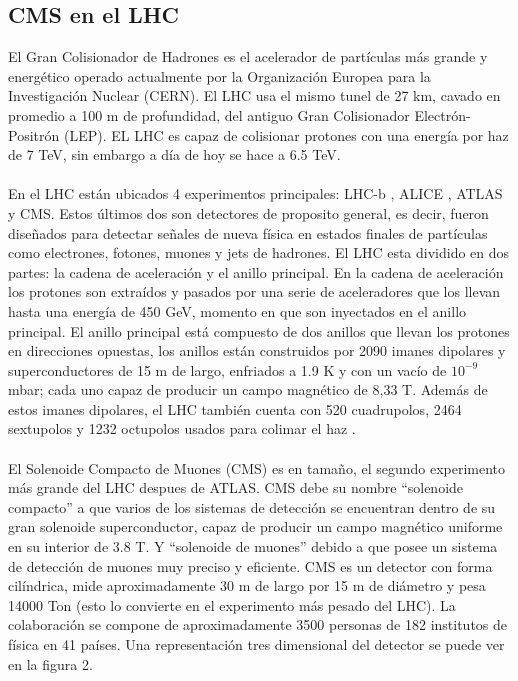 \subsection{CMS en el LHC}
El Gran Colisionador de Hadrones es el acelerador de partículas más grande y energético operado actualmente por la Organización Europea para la Investigación Nuclear (CERN). El LHC usa el mismo tunel de 27 km, cavado en promedio a 100 m de profundidad, del antiguo Gran Colisionador Electrón-Positrón (LEP). EL LHC es capaz de colisionar protones con una energía por haz de 7 TeV, sin embargo a día de hoy se hace a 6.5 TeV.
\\
\\
En el LHC están ubicados 4 experimentos principales: LHC-b \cite{Alves:2008zz}, ALICE \cite{Aamodt:2008zz}, ATLAS \cite{Aad:2008zzm} y CMS. Estos últimos dos son detectores de proposito general, es decir, fueron diseñados para detectar señales de nueva física en estados finales de partículas como electrones, fotones, muones y jets de hadrones. El LHC esta dividido en dos partes: la cadena de aceleración y el anillo principal. En la cadena de aceleración los protones son extraídos y pasados por una serie de aceleradores que los llevan hasta una energía de 450 GeV, momento en que son inyectados en el anillo principal. El anillo principal está compuesto de dos anillos que llevan los protones en direcciones opuestas, los anillos están construidos por 2090 imanes dipolares y superconductores de 15 m de largo, enfriados a 1.9 K y con un vacío de $10^{-9}$mbar; cada uno capaz de producir un campo magnético de 8,33 T. Además de estos imanes dipolares, el LHC también cuenta con 520 cuadrupolos, 2464 sextupolos y 1232 octupolos usados para colimar el haz \cite{RuizAlvarez:2016mhn}. 
\\
\\
El Solenoide Compacto de Muones (CMS) es en tamaño, el segundo experimento más grande del LHC despues de ATLAS. CMS debe su nombre ``solenoide compacto'' a que varios de los sistemas de detección se encuentran dentro de su gran solenoide superconductor, capaz de producir un campo magnético uniforme en su interior de 3.8 T. Y ``solenoide de muones'' debido a que posee un sistema de detección de muones muy preciso y eficiente. CMS es un detector con forma cilíndrica, mide aproximadamente 30 m de largo por 15 m de diámetro y pesa 14000 Ton (esto lo convierte en el experimento más pesado del LHC). La colaboración se compone de aproximadamente 3500 personas de 182 institutos de física en 41 países. Una representación tres dimensional del detector se puede ver en la figura 2.
